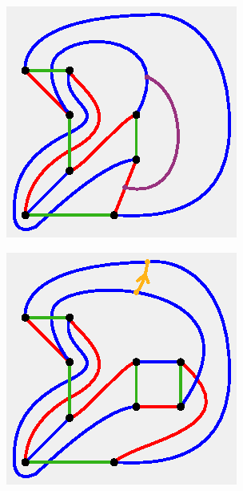 \documentclass[11pt, oneside]{amsart}
\theoremstyle{theorem}
\theoremstyle{definition}
\theoremstyle{theorem}
\begin{document}
\begin{figure}[h!]
\begin{subfigure}{.25\textwidth}
  \centering
  \includegraphics[width=.9\linewidth]{nonbt7.eps}
  \label{nxb7}
  \end{subfigure}
  \begin{subfigure}{.25\textwidth}
  \centering
  \includegraphics[width=.9\linewidth]{nonbt8.eps}
  \label{nxb8}
\end{subfigure}

\end{figure}
\end{document}
